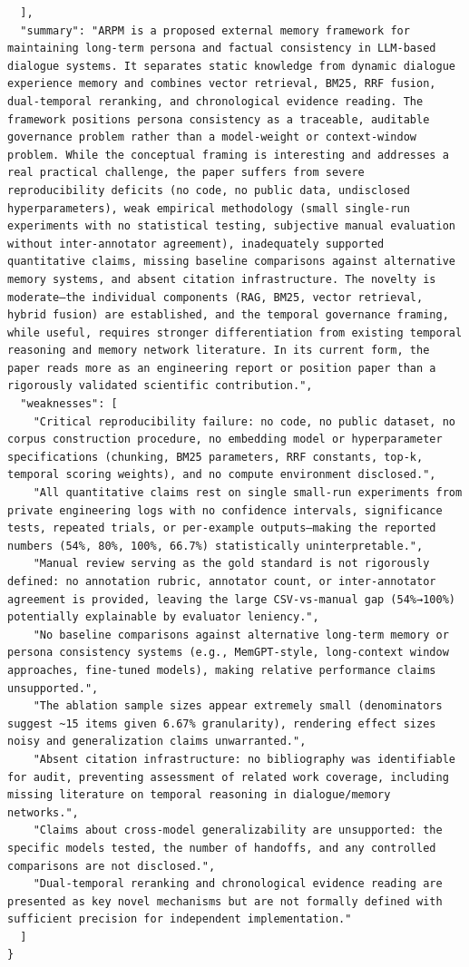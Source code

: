 \documentclass[11pt]{article}
\begin{document}
\begin{verbatim}
  ],
  "summary": "ARPM is a proposed external memory framework for maintaining long-term persona and factual consistency in LLM-based dialogue systems. It separates static knowledge from dynamic dialogue experience memory and combines vector retrieval, BM25, RRF fusion, dual-temporal reranking, and chronological evidence reading. The framework positions persona consistency as a traceable, auditable governance problem rather than a model-weight or context-window problem. While the conceptual framing is interesting and addresses a real practical challenge, the paper suffers from severe reproducibility deficits (no code, no public data, undisclosed hyperparameters), weak empirical methodology (small single-run experiments with no statistical testing, subjective manual evaluation without inter-annotator agreement), inadequately supported quantitative claims, missing baseline comparisons against alternative memory systems, and absent citation infrastructure. The novelty is moderate—the individual components (RAG, BM25, vector retrieval, hybrid fusion) are established, and the temporal governance framing, while useful, requires stronger differentiation from existing temporal reasoning and memory network literature. In its current form, the paper reads more as an engineering report or position paper than a rigorously validated scientific contribution.",
  "weaknesses": [
    "Critical reproducibility failure: no code, no public dataset, no corpus construction procedure, no embedding model or hyperparameter specifications (chunking, BM25 parameters, RRF constants, top-k, temporal scoring weights), and no compute environment disclosed.",
    "All quantitative claims rest on single small-run experiments from private engineering logs with no confidence intervals, significance tests, repeated trials, or per-example outputs—making the reported numbers (54%, 80%, 100%, 66.7%) statistically uninterpretable.",
    "Manual review serving as the gold standard is not rigorously defined: no annotation rubric, annotator count, or inter-annotator agreement is provided, leaving the large CSV-vs-manual gap (54%→100%) potentially explainable by evaluator leniency.",
    "No baseline comparisons against alternative long-term memory or persona consistency systems (e.g., MemGPT-style, long-context window approaches, fine-tuned models), making relative performance claims unsupported.",
    "The ablation sample sizes appear extremely small (denominators suggest ~15 items given 6.67% granularity), rendering effect sizes noisy and generalization claims unwarranted.",
    "Absent citation infrastructure: no bibliography was identifiable for audit, preventing assessment of related work coverage, including missing literature on temporal reasoning in dialogue/memory networks.",
    "Claims about cross-model generalizability are unsupported: the specific models tested, the number of handoffs, and any controlled comparisons are not disclosed.",
    "Dual-temporal reranking and chronological evidence reading are presented as key novel mechanisms but are not formally defined with sufficient precision for independent implementation."
  ]
}
\end{verbatim}
\end{document}
